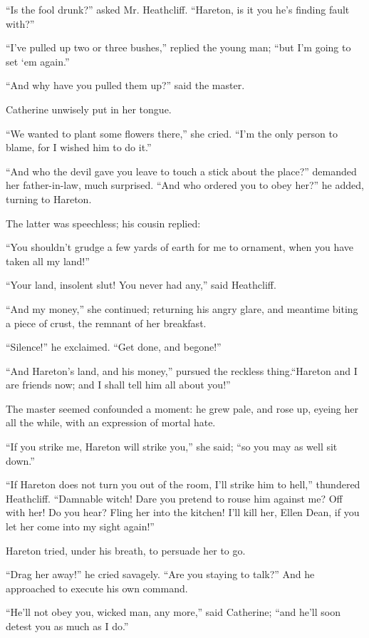 \par “Is the fool drunk?” asked Mr. Heathcliff. “Hareton, is it you he's finding fault with?”
\par “I've pulled up two or three bushes,” replied the young man; “but I'm going to set ‘em again.”
\par “And why have you pulled them up?” said the master.
\par Catherine unwisely put in her tongue.
\par “We wanted to plant some flowers there,” she cried. “I'm the only person to blame, for I wished him to do it.”
\par “And who the devil gave you leave to touch a stick about the place?” demanded her father-in-law, much surprised. “And who ordered you to obey her?” he added, turning to Hareton.
\par The latter was speechless; his cousin replied:
\par “You shouldn't grudge a few yards of earth for me to ornament, when you have taken all my land!”
\par “Your land, insolent slut! You never had any,” said Heathcliff.
\par “And my money,” she continued; returning his angry glare, and meantime biting a piece of crust, the remnant of her breakfast.
\par “Silence!” he exclaimed. “Get done, and begone!”
\par “And Hareton's land, and his money,” pursued the reckless thing.“Hareton and I are friends now; and I shall tell him all about you!”
\par The master seemed confounded a moment: he grew pale, and rose up, eyeing her all the while, with an expression of mortal hate.
\par “If you strike me, Hareton will strike you,” she said; “so you may as well sit down.”
\par “If Hareton does not turn you out of the room, I'll strike him to hell,” thundered Heathcliff. “Damnable witch! Dare you pretend to rouse him against me? Off with her! Do you hear? Fling her into the kitchen! I'll kill her, Ellen Dean, if you let her come into my sight again!”
\par Hareton tried, under his breath, to persuade her to go.
\par “Drag her away!” he cried savagely. “Are you staying to talk?” And he approached to execute his own command.
\par “He'll not obey you, wicked man, any more,” said Catherine; “and he'll soon detest you as much as I do.”
